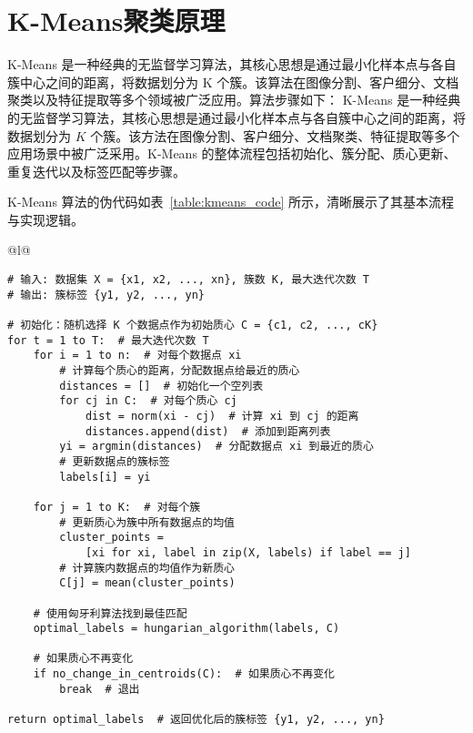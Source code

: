 \documentclass[master]{thesis-uestc}
\begin{document}
\section{K-Means聚类原理}
K-Means 是一种经典的无监督学习算法，其核心思想是通过最小化样本点与各自簇中心之间的距离，将数据划分为 K 个簇。该算法在图像分割、客户细分、文档聚类以及特征提取等多个领域被广泛应用。算法步骤如下：
K-Means 是一种经典的无监督学习算法，其核心思想是通过最小化样本点与各自簇中心之间的距离，将数据划分为 \(K\) 个簇。该方法在图像分割、客户细分、文档聚类、特征提取等多个应用场景中被广泛采用。K-Means 的整体流程包括初始化、簇分配、质心更新、重复迭代以及标签匹配等步骤。

K-Means 算法的伪代码如表~\ref{table:kmeans_code} 所示，清晰展示了其基本流程与实现逻辑。

\begin{table}[h]
    \caption{{KMeans算法伪代码}}
    {
    \begin{tabular}{@{}l@{}}
    \toprule
     \\
    \midrule
    \begin{lstlisting}[basicstyle=\fontspec{Times New Roman}, frame=none]
# 输入: 数据集 X = {x1, x2, ..., xn}, 簇数 K, 最大迭代次数 T
# 输出: 簇标签 {y1, y2, ..., yn}

# 初始化：随机选择 K 个数据点作为初始质心 C = {c1, c2, ..., cK}
for t = 1 to T:  # 最大迭代次数 T
    for i = 1 to n:  # 对每个数据点 xi
        # 计算每个质心的距离，分配数据点给最近的质心
        distances = []  # 初始化一个空列表
        for cj in C:  # 对每个质心 cj
            dist = norm(xi - cj)  # 计算 xi 到 cj 的距离
            distances.append(dist)  # 添加到距离列表
        yi = argmin(distances)  # 分配数据点 xi 到最近的质心
        # 更新数据点的簇标签
        labels[i] = yi
    
    for j = 1 to K:  # 对每个簇
        # 更新质心为簇中所有数据点的均值
        cluster_points = 
            [xi for xi, label in zip(X, labels) if label == j]
        # 计算簇内数据点的均值作为新质心
        C[j] = mean(cluster_points)
    
    # 使用匈牙利算法找到最佳匹配
    optimal_labels = hungarian_algorithm(labels, C)
    
    # 如果质心不再变化
    if no_change_in_centroids(C):  # 如果质心不再变化
        break  # 退出

return optimal_labels  # 返回优化后的簇标签 {y1, y2, ..., yn}
    \end{lstlisting} \\
    \bottomrule
    \end{tabular}
    }
    \label{table:kmeans_code}
\end{table}
\end{document}
